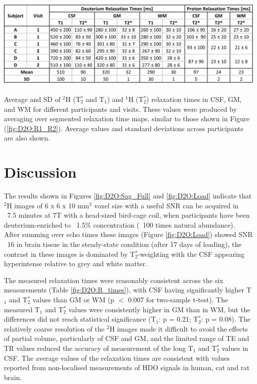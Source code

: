 \documentclass[class=article, crop=false]{standalone}
\begin{document}
\begin{table}[H]
    \centering
    \includegraphics[width=1\textwidth]{Figures/D2O/R_Times.png}
    \caption{Average and SD of $^2$H (T$_2^*$ and T$_1$) and $^1$H (T$_2^*$) relaxation times in CSF, GM, and WM for different participants and visits. These values were produced by averaging over segmented relaxation time maps, similar to those shown in Figure (\ref{fig:D2O:R1_R2}). Average values and standard deviations across participants are also shown.}
    \label{fig:D2O:R_times}
\end{table}
 
\section{Discussion}

The results shown in Figures \ref{fig:D2O:Sag_Full} and \ref{fig:D2O:Load} indicate that $^2$H images of 6 x 6 x 10 mm$^3$ voxel size with a useful SNR can be acquired in ~7.5 minutes at 7T with a head-sized bird-cage coil, when participants have been deuterium-enriched to ~1.5\% concentration (~100 times natural abundance). After summing over echo times these images (Figure \ref{fig:D2O:Load}) showed SNR ~16 in brain tissue in the steady-state condition (after 17 days of loading), the contrast in these images is dominated by T$_2^*$-weighting with the CSF appearing hyperintense relative to grey and white matter.

The measured relaxation times were reasonably consistent across the six measurements (Table \ref{fig:D2O:R_times}), with CSF having significantly higher T$_1$ and T$_2^*$ values than GM or WM (p $<$ 0.007 for two-sample t-test). The measured T$_1$ and T$_2^*$ values were consistently higher in GM than in WM, but the differences did not reach statistical significance (T$_1$: p = 0.21; T$_2^*$: p = 0.08). The relatively coarse resolution of the $^2$H images made it difficult to avoid the effects of partial volume, particularly of CSF and GM, and the limited range of TE and TR values reduced the accuracy of measurement of the long T$_1$ and T$_2^*$ values in CSF. The average values of the relaxation times are consistent with values reported from non-localised measurements of HDO signals in human\cite{DeFeyter2018DeuteriumVivo,DeFeyter2021DeuteriumFuture,Ruhm2021DeuteriumResolution}, cat\cite{Ewy1988DeuteriumSitu} and rat \cite{DeFeyter2018DeuteriumVivo,Lu2017QuantitativeSpectroscopy} brain.
\end{document}

